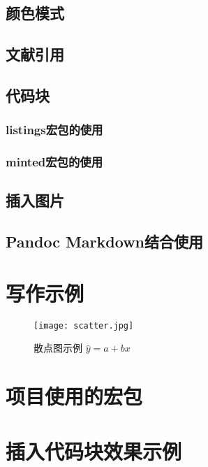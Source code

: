 \documentclass[12pt, blue]{uglynote}
\begin{document}
\subsection{颜色模式}\label{ssec:colors}


\subsection{文献引用}


\subsection{代码块}


\subsubsection{listings宏包的使用}

\subsubsection{minted宏包的使用}


\subsection{插入图片}


\subsection{Pandoc Markdown结合使用}



\section{写作示例}



\begin{figure}[htbp]
  \centering
  \texttt{[image: scatter.jpg]}
  \caption{散点图示例 $\hat{y}=a+bx$ \label{fig:scatter}}
\end{figure}



\printbibliography[
  title=\ebibname
]

\clearpage
\appendix
\addappheadtotoc
\appendixpage

\section{项目使用的宏包}


\section{插入代码块效果示例}

\end{document}
